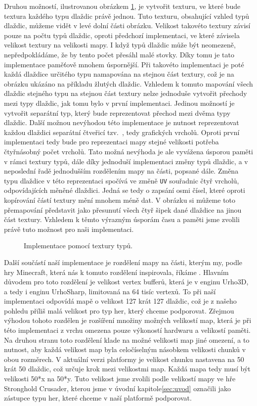 Druhou možností, ilustrovanou obrázkem \ref{fig:mapsmalltexture}, je vytvořit texturu, ve které bude textura každého typu dlaždic právě jednou. Tuto texturu, obsahující vzhled typů dlaždic, můžeme vidět v levé dolní části obrázku. Velikost takovéto textury závisí pouze na počtu typů dlaždic, oproti předchozí implementaci, ve které závisela velikost textury na velikosti mapy. I když typů dlaždic může být neomezeně, nepředpokládáme, že by tento počet přesáhl malé stovky. Díky tomu je tato implementace paměťově mnohem úspornější. Při takovéto implementaci je poté každá dlaždice určitého typu namapována na stejnou část textury, což je na obrázku ukázáno na příkladu žlutých dlaždic. Vzhledem k tomuto mapování všech dlaždic stejného typu na stejnou část textury nelze jednoduše vytvořit přechody mezi typy dlaždic, jak tomu bylo v první implementaci. Jedinou možností je vytvořit separátní typ, který bude reprezentovat přechod mezi dvěma typy dlaždic. Další možnou nevýhodou této implementace je nutnost reprezentovat každou dlaždici separátní čtveřicí tzv.~, tedy grafických vrcholů. Oproti první implementaci tedy bude pro reprezentaci mapy stejné velikosti potřeba čtyřnásobný počet vrcholů. Tato možná nevýhoda je ale vyvážena úsporou paměti v rámci textury typů, dále díky jednoduší implementaci změny typů dlaždic, a v neposlední řadě jednodušším rozdělením mapy na části, popsané dále. Změna typu dlaždice v této reprezentaci spočívá ve změně \texttt{UV} souřadnic čtyř vrcholů, odpovídajících měněné dlaždici. Jedná se tedy o zapsání osmi čísel, které oproti kopírování částí textury mění mnohem méně dat. V obrázku si můžeme toto přemapování představit jako přesunutí všech čtyř šipek dané dlaždice na jinou část textury. Vzhledem k těmto výrazným úsporám času a paměti jsme zvolili právě tuto možnost pro naši implementaci.

\begin{figure}[h]
	\centering
	
	\caption{Implementace pomocí textury typů.}
	\label{fig:mapsmalltexture}
\end{figure}


Další součástí naší implementace je rozdělení mapy na části, kterým my, podle hry Minecraft, která nás k tomuto rozdělení inspirovala, říkáme  . Hlavním důvodem pro toto rozdělení je velikost vertex bufferů, která je v enginu Urho3D, a tedy i enginu UrhoSharp, limitovaná na 64 tisíc vertexů. To při naší implementaci odpovídá mapě o velikost 127 krát 127 dlaždic, což je z našeho pohledu příliš malá velikost pro typ her, který chceme podporovat. Zřejmou výhodou tohoto rozdělen je rozšíření množiny možných velikostí map, která je při této implementaci z vrchu omezena pouze výkoností hardwaru a velikostí paměti. Na druhou stranu toto rozdělení klade na možné velikosti map jiné omezení, a to nutnost, aby každá velikost map byla celočíselným násobkem velikosti chunků v obou rozměrech. V aktuální verzi platformy je velikost chunku nastavena na 50 krát 50 dlaždic, což určuje krok mezi velikostmi map. Každá mapa tedy musí být velikosti 50*x na 50*y. Tuto velikost jsme zvolili podle velikostí mapy ve hře Stronghold Crusader, kterou jsme v úvodní kapitole\ref{sec:uvod} označili jako zástupce typu her, které chceme v naší platformě podporovat.

